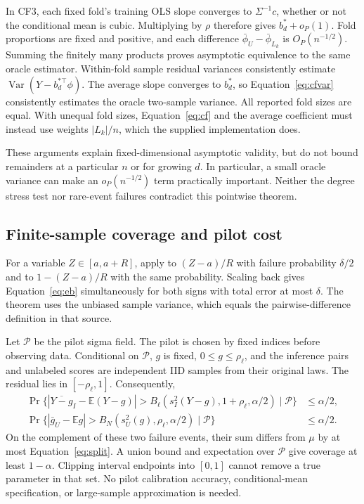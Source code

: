 \documentclass{article}
\newcommand{\E}{\mathbb E}
\newcommand{\Var}{\operatorname{Var}}
\begin{document}
In CF3, each fixed fold's training OLS slope converges to $\Sigma^{-1}c$, whether or not the conditional mean is cubic. Multiplying by $\rho$ therefore gives $b_d^*+o_P(1)$. Fold proportions are fixed and positive, and each difference $\bar\phi_U-\bar\phi_{L_k}$ is $O_P(n^{-1/2})$. Summing the finitely many products proves asymptotic equivalence to the same oracle estimator. Within-fold sample residual variances consistently estimate $\Var(Y-b_d^{*\top}\phi)$. The average slope converges to $b_d^*$, so Equation~\eqref{eq:cfvar} consistently estimates the oracle two-sample variance. All reported fold sizes are equal. With unequal fold sizes, Equation~\eqref{eq:cf} and the average coefficient must instead use weights $|L_k|/n$, which the supplied implementation does.

These arguments explain fixed-dimensional asymptotic validity, but do not bound remainders at a particular $n$ or for growing $d$. In particular, a small oracle variance can make an $o_P(n^{-1/2})$ term practically important. Neither the degree stress test nor rare-event failures contradict this pointwise theorem.

\subsection{Finite-sample coverage and pilot cost}
For a variable $Z\in[a,a+R]$, apply \citet[Theorem~4]{bernstein} to $(Z-a)/R$ with failure probability $\delta/2$ and to $1-(Z-a)/R$ with the same probability. Scaling back gives Equation~\eqref{eq:eb} simultaneously for both signs with total error at most $\delta$. The theorem uses the unbiased sample variance, which equals the pairwise-difference definition in that source.

Let $\mathcal P$ be the pilot sigma field. The pilot is chosen by fixed indices before observing data. Conditional on $\mathcal P$, $g$ is fixed, $0\le g\le\rho_\ell$, and the inference pairs and unlabeled scores are independent IID samples from their original laws. The residual lies in $[-\rho_\ell,1]$. Consequently,
\begin{align}
 \Pr\{ |\overline{Y-g}_I-\E(Y-g)|>B_\ell(s_I^2(Y-g),1+\rho_\ell,\alpha/2)\mid\mathcal P\}&\le\alpha/2,\\
 \Pr\{ |\bar g_U-\E g|>B_N(s_U^2(g),\rho_\ell,\alpha/2)\mid\mathcal P\}&\le\alpha/2.
 \label{eq:twobounds}
\end{align}
On the complement of these two failure events, their sum differs from $\mu$ by at most Equation~\eqref{eq:split}. A union bound and expectation over $\mathcal P$ give coverage at least $1-\alpha$. Clipping interval endpoints into $[0,1]$ cannot remove a true parameter in that set. No pilot calibration accuracy, conditional-mean specification, or large-sample approximation is needed.
\end{document}
